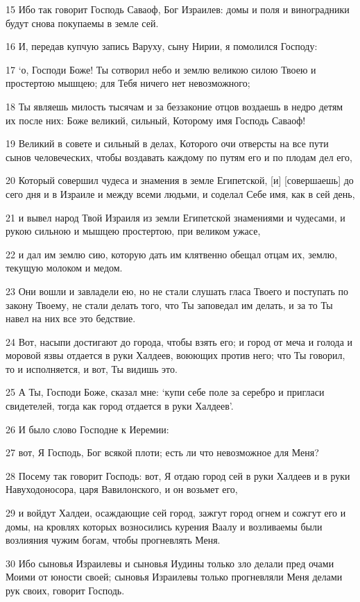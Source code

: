 \par 15 Ибо так говорит Господь Саваоф, Бог Израилев: домы и поля и виноградники будут снова покупаемы в земле сей.
\par 16 И, передав купчую запись Варуху, сыну Нирии, я помолился Господу:
\par 17 `о, Господи Боже! Ты сотворил небо и землю великою силою Твоею и простертою мышцею; для Тебя ничего нет невозможного;
\par 18 Ты являешь милость тысячам и за беззаконие отцов воздаешь в недро детям их после них: Боже великий, сильный, Которому имя Господь Саваоф!
\par 19 Великий в совете и сильный в делах, Которого очи отверсты на все пути сынов человеческих, чтобы воздавать каждому по путям его и по плодам дел его,
\par 20 Который совершил чудеса и знамения в земле Египетской, [и] [совершаешь] до сего дня и в Израиле и между всеми людьми, и соделал Себе имя, как в сей день,
\par 21 и вывел народ Твой Израиля из земли Египетской знамениями и чудесами, и рукою сильною и мышцею простертою, при великом ужасе,
\par 22 и дал им землю сию, которую дать им клятвенно обещал отцам их, землю, текущую молоком и медом.
\par 23 Они вошли и завладели ею, но не стали слушать гласа Твоего и поступать по закону Твоему, не стали делать того, что Ты заповедал им делать, и за то Ты навел на них все это бедствие.
\par 24 Вот, насыпи достигают до города, чтобы взять его; и город от меча и голода и моровой язвы отдается в руки Халдеев, воюющих против него; что Ты говорил, то и исполняется, и вот, Ты видишь это.
\par 25 А Ты, Господи Боже, сказал мне: `купи себе поле за серебро и пригласи свидетелей, тогда как город отдается в руки Халдеев'.
\par 26 И было слово Господне к Иеремии:
\par 27 вот, Я Господь, Бог всякой плоти; есть ли что невозможное для Меня?
\par 28 Посему так говорит Господь: вот, Я отдаю город сей в руки Халдеев и в руки Навуходоносора, царя Вавилонского, и он возьмет его,
\par 29 и войдут Халдеи, осаждающие сей город, зажгут город огнем и сожгут его и домы, на кровлях которых возносились курения Ваалу и возливаемы были возлияния чужим богам, чтобы прогневлять Меня.
\par 30 Ибо сыновья Израилевы и сыновья Иудины только зло делали пред очами Моими от юности своей; сыновья Израилевы только прогневляли Меня делами рук своих, говорит Господь.
